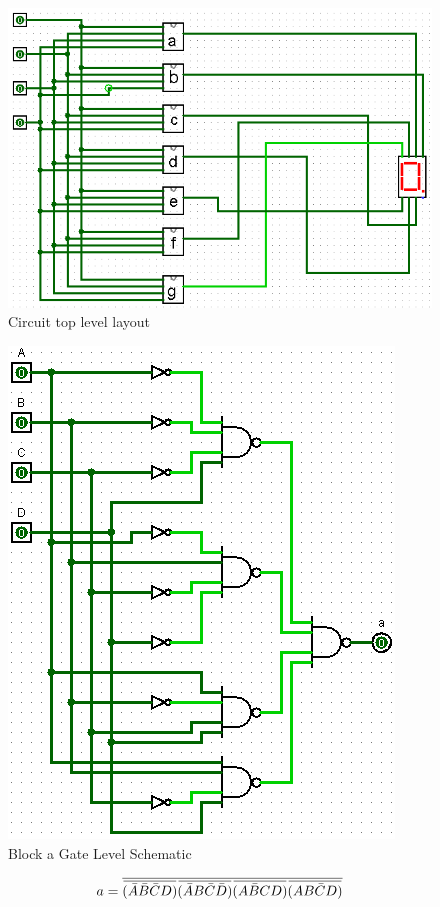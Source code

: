 \documentclass[12pt]{article}
\newcommand{\overbar}[1]{\mkern 1.5mu\overline{\mkern-1.5mu#1\mkern-1.5mu}\mkern 1.5mu} %
\begin{document}
\begin{figure}[h]
	\centering
	\label{fig:TopLevelCkt}
	\includegraphics[scale=.8]{topLevelLogicCkt.png}
	\caption{Circuit top level layout}
\end{figure}


\begin{figure}[h]
	\centering
	\label{fig:aBlockGates}
	\includegraphics[width=0.65\linewidth, keepaspectratio]{a_logicCkt}
	\caption{Block a Gate Level Schematic}
\end{figure}

\begin{equation}
	a = \overline{\overbar{(\bar{A}\bar{B}\bar{C}D)}\overbar{(\bar{A}B\bar{C}\bar{D})}\overbar{(A\bar{B}CD)}\overbar{(AB\bar{C}D)}}
\end{equation}
\end{document}
